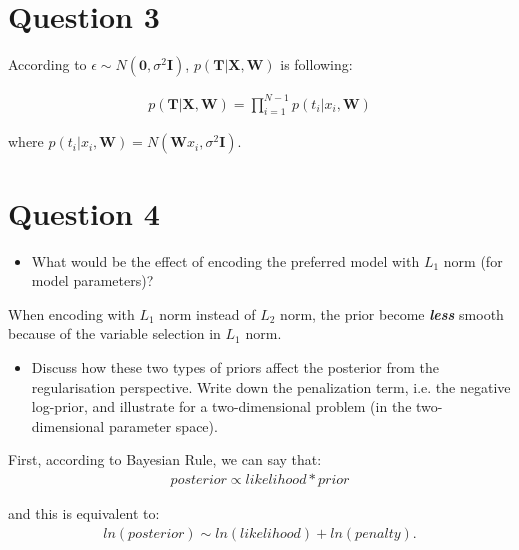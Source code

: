 \documentclass[12pt,letterpaper]{article}
\begin{document}
\section*{Question 3}

According to $\epsilon \sim N(\textbf{0}, \sigma^2 \textbf{I})$,
$p(\textbf{T} | \textbf{X}, \textbf{W})$ is following:

\begin{equation}
\begin{split}
p(\textbf{T} | \textbf{X}, \textbf{W}) = \prod_{i=1}^{N - 1} p(t_i | x_i, \textbf{W})
\end{split}
\end{equation}

where $p(t_i | x_i, \textbf{W}) = N(\textbf{W}x_i, \sigma^2 \textbf{I})$.



\section*{Question 4}

\begin{itemize}
  \item 
  What would be the effect of encoding the preferred model with $L_1$ norm (for model parameters)?
\end{itemize}

When encoding with $L_1$ norm instead of $L_2$ norm,
the prior become \textit{\textbf{less}} smooth
because of the variable selection in $L_1$ norm.


\begin{itemize}
  \item 
  Discuss how these two types of priors affect the posterior from the regularisation  perspective. Write down the penalization term, i.e. the negative log-prior, and illustrate for a two-dimensional problem (in the two-dimensional parameter space).
\end{itemize}

First, according to Bayesian Rule, we can say that:
\begin{equation}
\begin{split}
posterior \propto likelihood * prior
\end{split}
\end{equation}

and this is equivalent to:
\begin{equation}
\begin{split}
ln(posterior) \sim ln(likelihood) + ln(penalty).
\end{split}
\end{equation}
\end{document}
